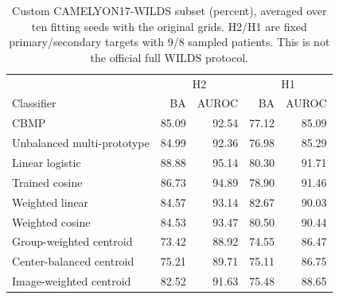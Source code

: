\begin{table}[!htbp]
\centering\footnotesize
\setlength{\tabcolsep}{3pt}
\begin{tabular}{lrrrr}
\hline
 & \multicolumn{2}{c}{H2} & \multicolumn{2}{c}{H1} \\
Classifier & BA & AUROC & BA & AUROC \\
\hline
CBMP & 85.09 & 92.54 & 77.12 & 85.09 \\
Unbalanced multi-prototype & 84.99 & 92.36 & 76.98 & 85.29 \\
Linear logistic & 88.88 & 95.14 & 80.30 & 91.71 \\
Trained cosine & 86.73 & 94.89 & 78.90 & 91.46 \\
Weighted linear & 84.57 & 93.14 & 82.67 & 90.03 \\
Weighted cosine & 84.53 & 93.47 & 80.50 & 90.44 \\
Group-weighted centroid & 73.42 & 88.92 & 74.55 & 86.47 \\
Center-balanced centroid & 75.21 & 89.71 & 75.11 & 86.75 \\
Image-weighted centroid & 82.52 & 91.63 & 75.48 & 88.65 \\
\hline
\end{tabular}
\caption{Custom CAMELYON17-WILDS subset (percent), averaged over ten fitting seeds with the original grids. H2/H1 are fixed primary/secondary targets with 9/8 sampled patients. This is not the official full WILDS protocol.}
\label{tab:supp_camelyon_original}
\end{table}